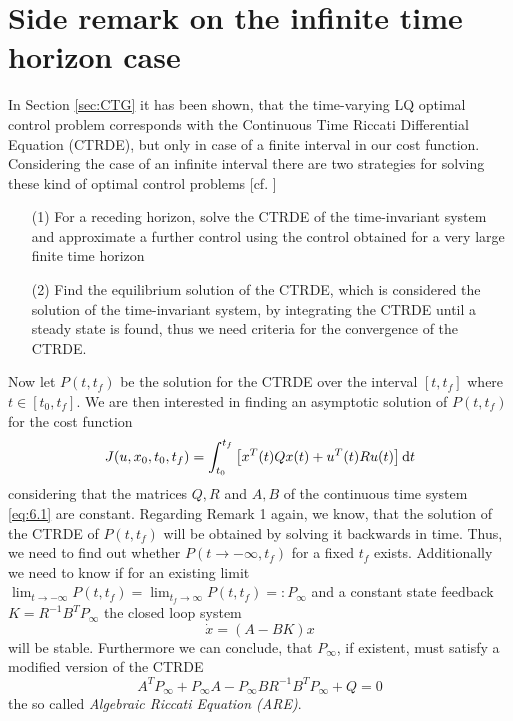 \documentclass[paper=a4, pagesize, DIV=calc, BCOR=12.5mm, twoside=on, onecolumn=on, open = any, titlepage =on, parskip =half-, headsepline = on, footsepline = on, chapterprefix = on, appendixprefix = off, fontsize = 12pt, numbers = noenddot, abstract = on]{scrbook}
\numberwithin{equation}{chapter}
\theoremstyle{definition}
\theoremstyle{plain}
\theoremstyle{plain}
\theoremstyle{remark}
\theoremstyle{plain}
\theoremstyle{plain}
\begin{document}
\section{Side remark on the infinite time horizon case} \label{sec:remark ARE}
\onehalfspacing
In Section \ref{sec:CTG} it has been shown, that the time-varying LQ optimal control problem corresponds with the Continuous Time Riccati Differential Equation (CTRDE), but only in case of a finite interval in our cost function. Considering the case of an infinite interval there are two strategies for solving these kind of optimal control problems [cf.  \cite{willems:1991}]
\begin{itemize}
\item[(1)] For a receding horizon, solve the CTRDE of the time-invariant system and approximate a further control using the control obtained for a very large finite time horizon
\item[(2)] Find the equilibrium solution of the CTRDE, which is considered the solution of the time-invariant system, by integrating the CTRDE until a steady state is found, thus we need criteria for the convergence of the CTRDE.
\end{itemize}
Now let $P(t, t_f)$ be the solution for the CTRDE over the interval $\left[ t, t_f \right]$ where $t \in \left[ t_0, t_f \right]$. We are then interested in finding an asymptotic solution of $P(t, t_f)$ for the cost function \begin{equation}
J(u, x_0, t_0, t_f) = \int_{t_0}^{t_f} \left[ x^T(t)Qx(t) + u^T(t)Ru(t) \right] \mathop{}\!\mathrm{d} t
\end{equation} considering that the matrices $Q, R$ and $A, B$ of the continuous time system \eqref{eq:6.1} are constant. Regarding Remark 1 again, we know, that the solution of the CTRDE of $P(t, t_f)$  will be obtained by solving it backwards in time.  Thus, we need to find out whether $P(t \rightarrow - \infty, t_f)$ for a fixed  $t_f$ exists. Additionally we need to know if for an existing limit $\lim_{t \rightarrow - \infty} P(t, t_f) = \lim_{t_f \rightarrow \infty}P(t, t_f) =: P_\infty$ and a constant state feedback $K = R^{-1}B^TP_\infty$ the closed loop system \begin{equation} \dot{x} = (A-BK)x \label{eq:TIS} \end{equation} will be stable. Furthermore we can conclude, that $P_\infty$, if existent, must satisfy a modified version of the CTRDE
\begin{equation}
A^TP_\infty + P_\infty A - P_\infty BR^{-1}B^TP_\infty + Q = 0 \label{eq:ARE}
\end{equation}
the so called \emph{Algebraic Riccati Equation (ARE)}.
\end{document}
